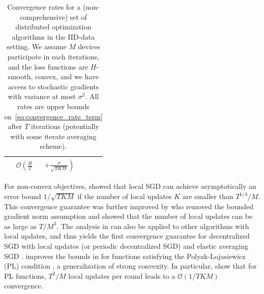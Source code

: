 \documentclass[11pt]{article}
\newcommand{\sketch}[1]{[{\color{darkgreen}{\emph{#1}}}]}
\newcommand{\BO}{\mathcal{O}}
\begin{document}
\begin{table}
\begin{centering}
\begin{minipage}{\linewidth}
{\begin{tabular}{@{}llll@{\hskip-2pt}l@{}}
     & $\BO \left(\frac{H}{T} \right.$ & $\left. + \frac{\sigma}{\sqrt{TKM}} \right)$ \\
\bottomrule
\end{tabular}
}%
\end{minipage}
\caption{Convergence rates for a (non-comprehensive) set of distributed optimization algorithms in the IID-data setting. We assume $M$ devices participate in each iterations, and the loss functions are $H$-smooth, convex, and we have access to stochastic gradients with variance at most $\sigma^2$. All rates are upper bounds on~\eqref{eq:convergence_rate_term} after $T$ iterations (potentially with some iterate averaging scheme).\\
}
\label{tab:iid-convergence}
\end{centering}
\end{table}


For non-convex objectives, \citet{yu2018parallel} showed that local SGD can achieve asymptotically an error bound $1/\sqrt{TKM}$ if the number of local updates $K$ are smaller than $T^{1/3}/M$. This convergence guarantee was further improved by \citet{wang2018cooperative} who removed the bounded gradient norm assumption and showed that the number of local updates can be as large as $T/M^3$. The analysis in \cite{wang2018cooperative} can also be applied to other algorithms with local updates, and thus yields the first convergence guarantee for decentralized SGD with local updates (or periodic decentralized SGD) and elastic averaging SGD \cite{zhang2015deep}.
\citet{haddadpour2019local} improves the bounds in \citet{wang2018cooperative} for functions satisfying the Polyak-Lojasiewicz (PL) condition \citep{karimi2016linear}, a generalization of strong convexity. In particular, \citet{haddadpour2019local} show that for PL functions, $T^2/M$ local updates per round leads to a $\BO(1/TKM)$ convergence.
\end{document}
